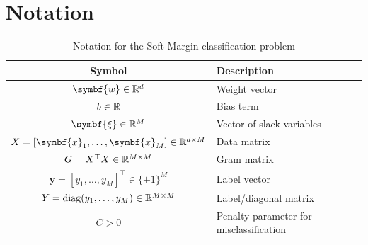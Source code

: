 \documentclass[a4paper, 10pt]{article}
\begin{document}


\tableofcontents

\section*{Notation}
\begin{table}[H]
	\centering
	\begin{tabular}{|c|l|}
		\hline
		\textbf{Symbol}                                               & \textbf{Description}                    \\
		\hline
		$\symbf{w} \in \R^d$                                          & Weight vector                           \\
		\hline
		$b \in \mathbb{R}$                                                    & Bias term                               \\
		\hline
		$\symbf{\xi} \in \R^M$                                        & Vector of slack variables               \\
		\hline
		$X = [\symbf{x}_1, \ldots, \symbf{x}_M] \in \R^{d \times M}$  & Data matrix                             \\
		\hline
		$G = X^\top X \in \mathbb{R}^{M \times M}$                            & Gram matrix                             \\
		\hline
		$\symbf{y}=[y_1, \ldots, y_M]^\top \in \{\pm1\}^M$            & Label vector                            \\
		\hline
		$Y = \operatorname{diag}(y_1,\ldots,y_M) \in \mathbb{R}^{M \times M}$ & Label/diagonal matrix                   \\
		\hline
		$C > 0$                                                       & Penalty parameter for misclassification \\
		\hline
	\end{tabular}
	\caption{Notation for the Soft-Margin classification problem}
	\label{tab:notation}
\end{table}
\clearpage

\vspace{-0.5cm}

\vspace{-0.5cm}

\vspace{-0.5cm}

\vspace{-0.5cm}

\vspace{-0.5cm}

\vspace{-0.5cm}
\printbibliography[title={References}]
\end{document}
